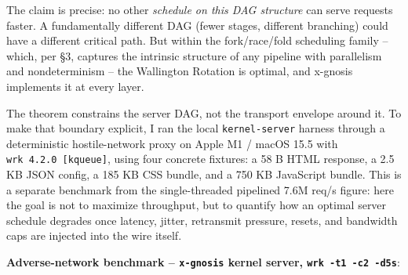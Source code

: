 \documentclass[
  11pt,
]{article}
\begin{document}
The claim is precise: no other \emph{schedule on this DAG structure} can
serve requests faster. A fundamentally different DAG (fewer stages,
different branching) could have a different critical path. But within
the fork/race/fold scheduling family -- which, per §3, captures the
intrinsic structure of any pipeline with parallelism and nondeterminism
-- the Wallington Rotation is optimal, and x-gnosis implements it at
every layer.

The theorem constrains the server DAG, not the transport envelope around
it. To make that boundary explicit, I ran the local
\texttt{kernel-server} harness through a deterministic hostile-network
proxy on Apple M1 / macOS 15.5 with \texttt{wrk\ 4.2.0\ {[}kqueue{]}},
using four concrete fixtures: a 58 B HTML response, a 2.5 KB JSON
config, a 185 KB CSS bundle, and a 750 KB JavaScript bundle. This is a
separate benchmark from the single-threaded pipelined 7.6M req/s figure:
here the goal is not to maximize throughput, but to quantify how an
optimal server schedule degrades once latency, jitter, retransmit
pressure, resets, and bandwidth caps are injected into the wire itself.

\textbf{Adverse-network benchmark -- \texttt{x-gnosis} kernel server,
\texttt{wrk\ -t1\ -c2\ -d5s}}:
\end{document}
